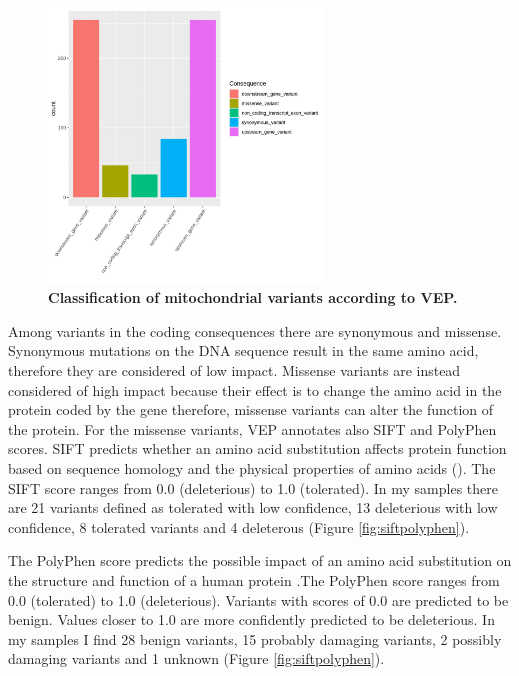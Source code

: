 \begin{figure}[H]
\centering
\includegraphics[width=0.65\textwidth]{Fig/VepConseguence_decom_plot.jpg}
\decoRule
\caption{\textbf{Classification of mitochondrial variants according to VEP.}}
\label{Fig:Vep Consequence}
\end{figure}

Among variants in the coding consequences there are synonymous and missense. Synonymous mutations on the DNA sequence result in the same amino acid, therefore they are considered of low impact. Missense variants are instead considered of high impact because their effect is to change the amino acid in the protein coded by the gene therefore, missense variants can alter the function of the protein. For the missense variants, VEP annotates also SIFT and PolyPhen scores. SIFT predicts whether an amino acid substitution affects protein function based on sequence homology and the physical properties of amino acids (\cite{ng2003sift}). The SIFT score ranges from 0.0 (deleterious) to 1.0 (tolerated). In my samples there are 21 variants defined as tolerated with low confidence, 13 deleterious with low confidence, 8 tolerated variants and 4 deleterous (Figure \ref{fig:siftpolyphen}).
 
The PolyPhen score predicts the possible impact of an amino acid substitution on the structure and function of a human protein \cite{adzhubei2013predicting}.The PolyPhen score ranges from 0.0 (tolerated) to 1.0 (deleterious). Variants with scores of 0.0 are predicted to be benign. Values closer to 1.0 are more confidently predicted to be deleterious. In my samples I find 28 benign variants, 15 probably damaging variants, 2 possibly damaging variants and 1 unknown (Figure \ref{fig:siftpolyphen}).\\

